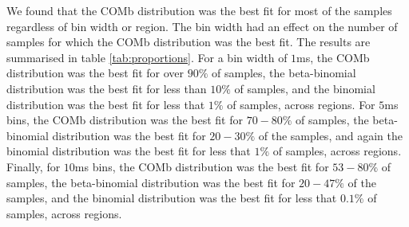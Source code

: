   We found that the COMb distribution was the best fit for most of the samples regardless of bin width or region. The bin width had an effect on the number of samples for which the COMb distribution was the best fit. The results are summarised in table \ref{tab:proportions}. For a bin width of $1$ms, the COMb distribution was the best fit for over $90\%$ of samples, the beta-binomial distribution was the best fit for less than $10\%$ of samples, and the binomial distribution was the best fit for less that $1\%$ of samples, across regions. For $5$ms bins, the COMb distribution was the best fit for $70-80\%$ of samples, the beta-binomial distribution was the best fit for $20-30\%$ of the samples, and again the binomial distribution was the best fit for less that $1\%$ of samples, across regions. Finally, for $10$ms bins,  the COMb distribution was the best fit for $53-80\%$ of samples, the beta-binomial distribution was the best fit for $20-47\%$ of the samples, and the binomial distribution was the best fit for less that $0.1\%$ of samples, across regions.

